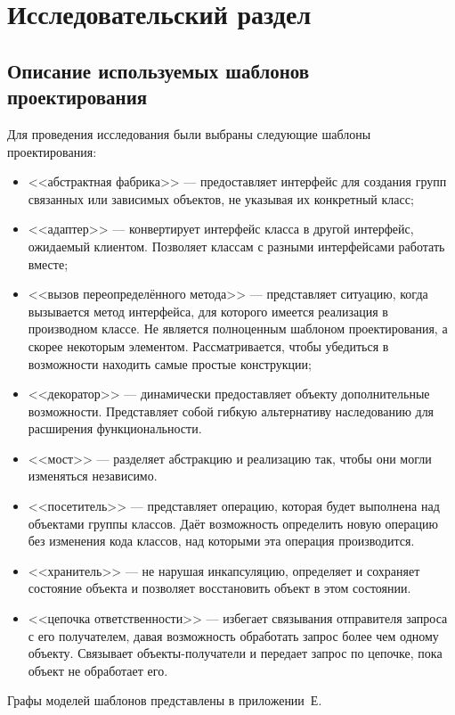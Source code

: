 \chapter{Исследовательский раздел}
\label{cha:research}

\section{Описание используемых шаблонов проектирования}

Для проведения исследования были выбраны следующие шаблоны проектирования:
\begin{itemize}
\item <<абстрактная фабрика>> --- предоставляет интерфейс для создания групп
связанных или зависимых объектов, не указывая их конкретный класс;
\item <<адаптер>> --- конвертирует интерфейс класса в другой интерфейс,
ожидаемый клиентом. Позволяет классам с разными интерфейсами работать вместе;
\item <<вызов переопределённого метода>> --- представляет ситуацию,
когда вызывается метод интерфейса,
для которого имеется реализация в производном классе.
Не является полноценным шаблоном проектирования, а скорее некоторым элементом.
Рассматривается, чтобы убедиться в возможности находить самые простые конструкции;
\item <<декоратор>> --- динамически предоставляет объекту дополнительные
возможности.
Представляет собой гибкую альтернативу наследованию для расширения
функциональности.
\item <<мост>> --- разделяет абстракцию и реализацию так,
чтобы они могли изменяться независимо.
\item <<посетитель>> --- представляет операцию, которая будет выполнена над
объектами группы классов.
Даёт возможность определить новую операцию без изменения кода классов,
над которыми эта операция производится.
\item <<хранитель>> --- не нарушая инкапсуляцию, определяет и сохраняет
состояние объекта и позволяет восстановить объект в этом состоянии.
\item <<цепочка ответственности>> --- избегает связывания отправителя запроса с
его получателем, давая возможность обработать запрос более чем одному объекту.
Связывает объекты-получатели и передает запрос по цепочке, пока объект не
обработает его.
\end{itemize}

Графы моделей шаблонов представлены в приложении~Е.

